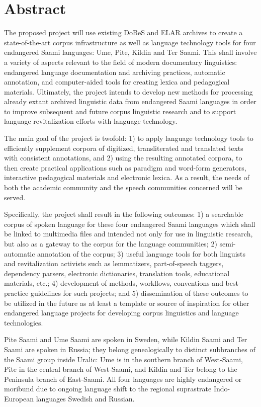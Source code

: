 \documentclass[a4paper,12pt]{article}
\begin{document}
\section{Abstract}
The proposed project will use existing DoBeS and ELAR archives to create a state-of-the-art corpus infrastructure as well as language technology tools for four endangered Saami languages: Ume, Pite, Kildin and Ter Saami. This shall involve a variety of aspects relevant to the field of modern documentary linguistics: endangered language documentation and archiving practices, automatic annotation, and computer-aided tools for creating lexica and pedagogical materials. Ultimately, the project intends to develop new methods for processing already extant archived linguistic data from endangered Saami languages in order to improve subsequent and future corpus linguistic research and to support language revitalization efforts with language technology.

The main goal of the project is twofold: 1) to apply language technology tools to efficiently supplement corpora of digitized, transliterated and translated texts with consistent annotations, and 2) using the resulting annotated corpora, to then create practical applications such as paradigm and word-form generators, interactive pedagogical materials and electronic lexica. As a result, the needs of both the academic community and the speech communities concerned will be served.

Specifically, the project shall result in the following outcomes: 1) a searchable corpus of spoken language for these four endangered Saami languages which shall be linked to multimedia files and intended not only for use in linguistic research, but also as a gateway to the corpus for the language communities; 2) semi-automatic annotation of the corpus; 3) useful language tools for both linguists and revitalization activists such as lemmatizers, part-of-speech taggers, dependency parsers, electronic dictionaries, translation tools, educational materials, etc.; 4) development of methods, workflows, conventions and best-practice guidelines for such projects; and 5) dissemination of these outcomes to be utilized in the future as at least a template or source of inspiration for other endangered language projects for developing corpus linguistics and language technologies.

Pite Saami and Ume Saami are spoken in Sweden, while Kildin Saami and Ter Saami are spoken in Russia; they belong genealogically to distinct subbranches of the Saami group inside Uralic: Ume is in the southern branch of West-Saami, Pite in the central branch of West-Saami, and Kildin and Ter belong to the Peninsula branch of East-Saami. All four languages are highly endangered or moribund due to ongoing language shift to the regional suprastrate Indo-European languages Swedish and Russian.
\end{document}
